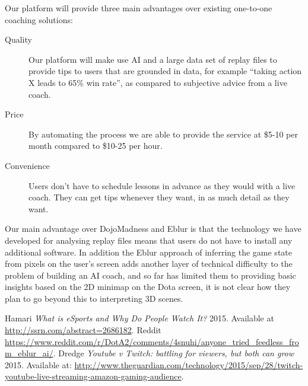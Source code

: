 \documentclass[12pt]{article} %
\begin{document}
Our platform will provide three main advantages over existing one-to-one coaching solutions: 

\begin{description}
    \item [Quality] Our platform will make use AI and a large data set of replay files to provide tips to users that are grounded in data, for example ``taking action X leads to 65\% win rate'', as compared to subjective advice from a live coach.
    \item [Price] By automating the process we are able to provide the service at \$5-10 per month compared to \$10-25 per hour.
    \item [Convenience] Users don't have to schedule lessons in advance as they would with a live coach. They can get tips whenever they want, in as much detail as they want.
\end{description}


Our main advantage over DojoMadness and Eblur is that the technology we have developed for analysing replay files means that users do not have to install any additional software. In addition the Eblur approach of inferring the game state from pixels on the user's screen adds another layer of technical difficulty to the problem of building an AI coach, and so far has limited them to providing basic insights based on the 2D minimap on the Dota screen, it is not clear how they plan to go beyond this to interpreting 3D scenes. 

\begin{thebibliography}{10}

  Hamari  {\em What is eSports and Why Do People Watch It?} 2015. Available at \url{http://ssrn.com/abstract=2686182}.
 Reddit \url{https://www.reddit.com/r/DotA2/comments/4snuhi/anyone_tried_feedless_from_eblur_ai/}.
 Dredge  {\em Youtube v Twitch: battling for viewers, but both can grow}  2015. Available at: \url{http://www.theguardian.com/technology/2015/sep/28/twitch-youtube-live-streaming-amazon-gaming-audience}.

\end{thebibliography}
\end{document}
